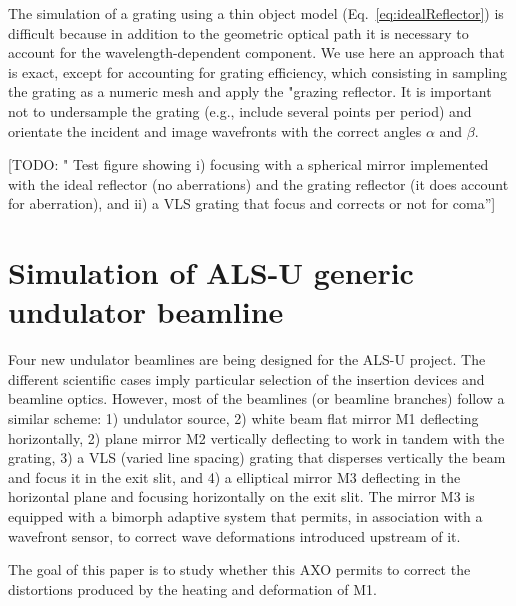 \documentclass{iucr}              %
\newcommand{\todo}[1]{{\color{red}[TODO: "#1'']}}
\begin{document}
The simulation of a grating using a thin object model (Eq.~\ref{eq:idealReflector}) is difficult because in addition to the geometric optical path it is necessary to account for the wavelength-dependent component. We use here an approach that is exact, except for accounting for grating efficiency, which consisting in sampling the grating as a numeric mesh and apply the "grazing reflector. It is important not to undersample the grating (e.g., include several points per period) and orientate the incident and image wavefronts with the correct angles $\alpha$ and $\beta$.      

\todo{  Test figure showing i) focusing with a spherical mirror implemented with the ideal reflector (no aberrations) and the grating reflector (it does account for aberration), and ii) a VLS grating that focus and corrects or not for coma}


\section{Simulation of ALS-U generic undulator beamline}

Four new undulator beamlines are being designed for the ALS-U project. The different scientific cases imply particular selection of the insertion devices and beamline optics. However, most of the beamlines (or beamline branches) follow a similar scheme: 1) undulator source, 2) white beam flat mirror M1 deflecting horizontally, 2) plane mirror M2 vertically deflecting to work in tandem with the grating, 3) a VLS (varied line spacing) grating that disperses vertically the beam and focus it in the exit slit, and 4) a elliptical mirror M3 deflecting in the horizontal plane and focusing horizontally on the exit slit. The mirror M3 is equipped with a bimorph adaptive system that permits, in association with a wavefront sensor, to correct wave deformations introduced upstream of it.

The goal of this paper is to study whether this AXO permits to correct the distortions produced by the heating and deformation of M1.
\end{document}
